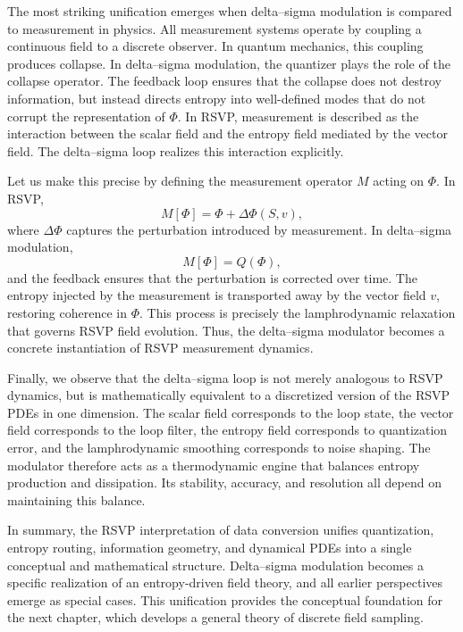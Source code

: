 The most striking unification emerges when delta–sigma modulation is compared to measurement in physics. All measurement systems operate by coupling a continuous field to a discrete observer. In quantum mechanics, this coupling produces collapse. In delta–sigma modulation, the quantizer plays the role of the collapse operator. The feedback loop ensures that the collapse does not destroy information, but instead directs entropy into well-defined modes that do not corrupt the representation of \(\Phi\). In RSVP, measurement is described as the interaction between the scalar field and the entropy field mediated by the vector field. The delta–sigma loop realizes this interaction explicitly.

Let us make this precise by defining the measurement operator \(M\) acting on \(\Phi\). In RSVP,
\[
M[\Phi] = \Phi + \Delta \Phi(S,v),
\]
where \(\Delta\Phi\) captures the perturbation introduced by measurement. In delta–sigma modulation,
\[
M[\Phi] = Q(\Phi),
\]
and the feedback ensures that the perturbation is corrected over time. The entropy injected by the measurement is transported away by the vector field \(v\), restoring coherence in \(\Phi\). This process is precisely the lamphrodynamic relaxation that governs RSVP field evolution. Thus, the delta–sigma modulator becomes a concrete instantiation of RSVP measurement dynamics.

Finally, we observe that the delta–sigma loop is not merely analogous to RSVP dynamics, but is mathematically equivalent to a discretized version of the RSVP PDEs in one dimension. The scalar field corresponds to the loop state, the vector field corresponds to the loop filter, the entropy field corresponds to quantization error, and the lamphrodynamic smoothing corresponds to noise shaping. The modulator therefore acts as a thermodynamic engine that balances entropy production and dissipation. Its stability, accuracy, and resolution all depend on maintaining this balance.

In summary, the RSVP interpretation of data conversion unifies quantization, entropy routing, information geometry, and dynamical PDEs into a single conceptual and mathematical structure. Delta–sigma modulation becomes a specific realization of an entropy-driven field theory, and all earlier perspectives emerge as special cases. This unification provides the conceptual foundation for the next chapter, which develops a general theory of discrete field sampling.


